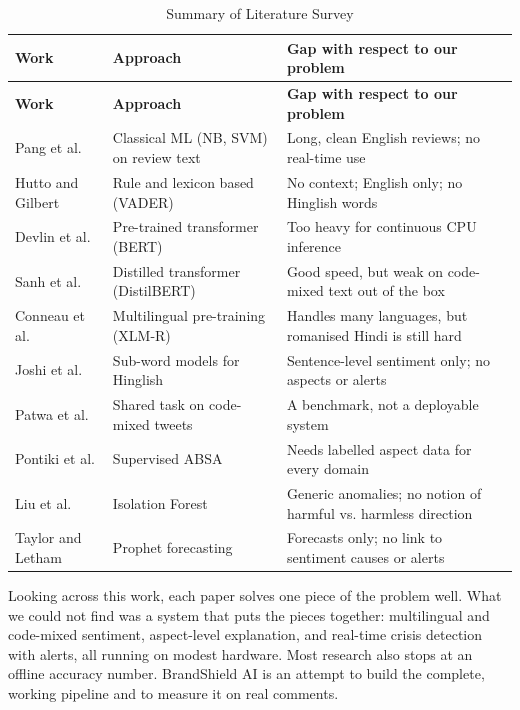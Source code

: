 \documentclass[12pt,a4paper]{report}
\begin{document}
\begin{longtable}{|P{3.2cm}|P{4.4cm}|P{6.2cm}|}
\caption{Summary of Literature Survey}
\label{tab:litsummary}\\
\hline
\textbf{Work} & \textbf{Approach} & \textbf{Gap with respect to our problem} \\
\hline
\endfirsthead
\hline
\textbf{Work} & \textbf{Approach} & \textbf{Gap with respect to our problem} \\
\hline
\endhead
Pang et al. \cite{pang2002} & Classical ML (NB, SVM) on review text & Long, clean English reviews; no real-time use \\ \hline
Hutto and Gilbert \cite{hutto2014} & Rule and lexicon based (VADER) & No context; English only; no Hinglish words \\ \hline
Devlin et al. \cite{devlin2019} & Pre-trained transformer (BERT) & Too heavy for continuous CPU inference \\ \hline
Sanh et al. \cite{sanh2019} & Distilled transformer (DistilBERT) & Good speed, but weak on code-mixed text out of the box \\ \hline
Conneau et al. \cite{conneau2020} & Multilingual pre-training (XLM-R) & Handles many languages, but romanised Hindi is still hard \\ \hline
Joshi et al. \cite{joshi2016} & Sub-word models for Hinglish & Sentence-level sentiment only; no aspects or alerts \\ \hline
Patwa et al. \cite{patwa2020} & Shared task on code-mixed tweets & A benchmark, not a deployable system \\ \hline
Pontiki et al. \cite{pontiki2014} & Supervised ABSA & Needs labelled aspect data for every domain \\ \hline
Liu et al. \cite{liu2008} & Isolation Forest & Generic anomalies; no notion of harmful vs. harmless direction \\ \hline
Taylor and Letham \cite{taylor2018} & Prophet forecasting & Forecasts only; no link to sentiment causes or alerts \\ \hline
\end{longtable}

Looking across this work, each paper solves one piece of the problem well. What we could not find was a system that puts the pieces together: multilingual and code-mixed sentiment, aspect-level explanation, and real-time crisis detection with alerts, all running on modest hardware. Most research also stops at an offline accuracy number. BrandShield AI is an attempt to build the complete, working pipeline and to measure it on real comments.
\end{document}
